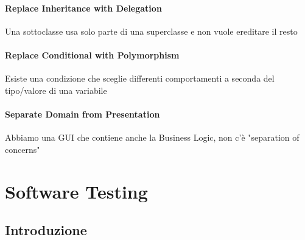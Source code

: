 \documentclass[12pt, a4paper]{report}
\begin{document}
\subsubsection{Replace Inheritance with Delegation}
Una sottoclasse usa solo parte di una superclasse e non vuole ereditare il resto
\subsubsection{Replace Conditional with Polymorphism}
Esiste una condizione che sceglie differenti comportamenti a seconda del tipo/valore di una variabile
\subsubsection{Separate Domain from Presentation}
Abbiamo  una GUI che contiene anche la Business Logic, non c'è "separation of concerns"
\chapter{Software Testing}
\section{Introduzione}
\end{document}
